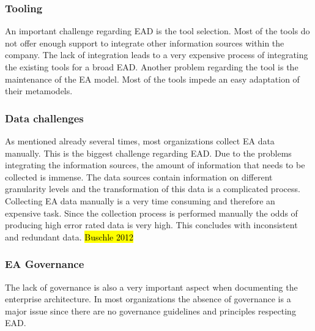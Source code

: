 \subsubsection{Tooling}
An important challenge regarding EAD is the tool selection. Most of the tools do not offer enough support to integrate other information sources within the company. The lack of integration leads to a very expensive process of integrating the existing tools for a broad EAD.
Another problem regarding the tool is the maintenance of the EA model. Most of the tools impede an easy adaptation of their metamodels.

\subsubsection{Data challenges}
As mentioned already several times, most organizations collect EA data manually. This is the biggest challenge regarding EAD. Due to the problems integrating the information sources, the amount of information that needs to be collected is immense. The data sources contain information on different granularity levels and the transformation of this data is a complicated process.
Collecting EA data manually is a very time consuming and therefore an expensive task. Since the collection process is performed manually the odds of producing high error rated data is very high. This concludes with inconsistent and redundant data. \hl{Buschle 2012}

\subsubsection{EA Governance}
The lack of governance is also a very important aspect when documenting the enterprise architecture. In most organizations the absence of governance is a major issue since there are no governance guidelines and principles respecting EAD.




